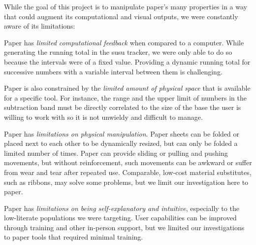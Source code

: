 \documentclass{sig-alternate}
\begin{document}



While the goal of this project is to manipulate paper's many properties in a way that could augment its computational and visual outputs, we were constantly aware of its limitations:
\begin{compactitem}
  \item Paper has \emph{limited computational feedback} when compared to a computer. While generating the running total in the susu tracker, we were only able to do so because the intervals were of a fixed value. Providing a dynamic running total for successive numbers with a variable interval between them is challenging. 
  \item Paper is also constrained by the \emph{limited amount of physical space} that is available for a specific tool. For instance, the range and the upper limit of numbers in the subtraction band must be directly correlated to the size of the base the user is willing to work with so it is not unwieldy and difficult to manage.
  \item Paper has \emph{limitations on physical manipulation}. Paper sheets can be folded or placed next to each other to be dynamically resized, but can only be folded a limited number of times. Paper can provide sliding or pulling and pushing movements, but without reinforcement, such movements can be awkward or suffer from wear and tear after repeated use. Comparable, low-cost material substitutes, such as ribbons, may solve some problems, but we limit our investigation here to paper.
  \item Paper has \emph{limitations on being self-explanatory and intuitive}, especially to the low-literate populations we were targeting. User capabilities can be improved through training and other in-person support, but we limited our investigations to paper tools that required minimal training.
\end{compactitem}
\end{document}
